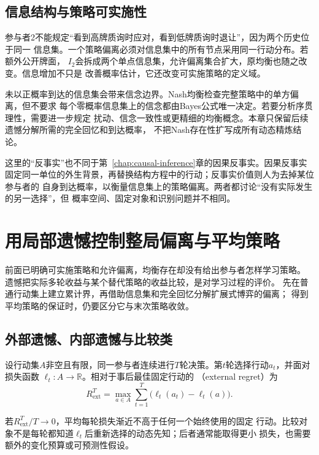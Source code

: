 \subsection{信息结构与策略可实施性}

参与者2不能规定“看到高牌质询时应对，看到低牌质询时退让”，因为两个历史位于同一
信息集。一个策略偏离必须对信息集中的所有节点采用同一行动分布。若额外公开牌面，
\(I_2\)会拆成两个单点信息集，允许偏离集合扩大，原均衡也随之改变。信息增加不只是
改善概率估计，它还改变可实施策略的定义域。

未以正概率到达的信息集会带来信念边界。Nash均衡检查完整策略中的单方偏离，但不要求
每个零概率信息集上的信念都由Bayes公式唯一决定。若要分析序贯理性，需要进一步规定
扰动、信念一致性或更精细的均衡概念。本章只保留后续遗憾分解所需的完全回忆和到达概率，
不把Nash存在性扩写成所有动态精炼结论。

这里的“反事实”也不同于第~\ref{chap:causal-inference}章的因果反事实。因果反事实
固定同一单位的外生背景，再替换结构方程中的行动；反事实价值则人为去掉某位参与者的
自身到达概率，以衡量信息集上的策略偏离。两者都讨论“没有实际发生的另一选择”，但
概率空间、固定对象和识别问题并不相同。

\section{用局部遗憾控制整局偏离与平均策略}
\label{sec:game-regret-cfr}

前面已明确可实施策略和允许偏离，均衡存在却没有给出参与者怎样学习策略。
遗憾把实际多轮收益与某个替代策略的收益比较，是对学习过程的评价。
先在普通行动集上建立累计界，再借助信息集和完全回忆分解扩展式博弈的偏离；
得到平均策略的保证时，仍要区分它与末次策略收敛。

\subsection{外部遗憾、内部遗憾与比较类}

\begin{definition}[外部遗憾]
\label{def:game-external-regret}
设行动集$A$非空且有限，同一参与者连续进行\(T\)轮决策。第\(t\)轮选择行动\(a_t\)，并面对损失函数
\(\ell_t:A\to\mathbb{R}\)。相对于事后最佳固定行动的
（external regret）为
\begin{equation}
  R_{\mathrm{ext}}^T
  =
  \max_{a\in A}
  \sum_{t=1}^{T}
  \bigl(\ell_t(a_t)-\ell_t(a)\bigr).
  \label{eq:game-external-regret}
\end{equation}
\end{definition}
若\(R_{\mathrm{ext}}^T/T\to0\)，平均每轮损失渐近不高于任何一个始终使用的固定
行动。比较对象不是每轮都知道\(\ell_t\)后重新选择的动态先知；后者通常能取得更小
损失，也需要额外的变化预算或可预测性假设。

